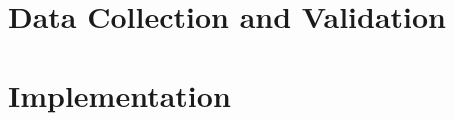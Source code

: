 \documentclass[a4paper, 11pt, oneside]{Thesis}  %
\begin{document}
\frontmatter      %






% 

% 













% 

% 

% 



\mainmatter	  %
\pagestyle{fancy}  %







\part{Data Collection and Validation}


\part{Implementation}


\end{document}

